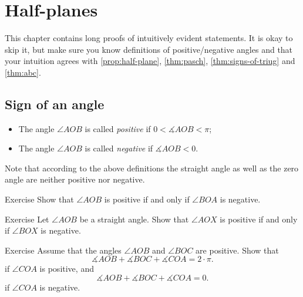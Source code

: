 \chapter{Half-planes}\label{chap:half-planes}

This chapter contains long proofs of intuitively evident statements.
It is okay to skip it, but make sure you know definitions of positive/negative angles and that your intuition agrees with \ref{prop:half-plane}, \ref{thm:pasch}, \ref{thm:signs-of-triug} and \ref{thm:abc}.

 
                            
\section*{Sign of an angle}

\begin{itemize}
\item The angle $\angle A O B$ is called \emph{positive} 
if $0<\measuredangle A O B<\pi$;
\item The  angle $\angle A O B$ is called {}\emph{negative} 
if $\measuredangle A O B<0$.
\end{itemize}

Note that according to the above definitions the straight angle as well as the zero angle 
are neither positive nor negative.

\begin{thm}{Exercise}\label{ex:AOB+<=>BOA-}
Show that $\angle A O B$ is positive if and only if $\angle B O A$ is negative.
\end{thm}

\begin{thm}{Exercise}\label{ex:straight-sign}
Let $\angle AOB$ be a straight angle.
Show that $\angle AOX$ is positive 
if and only if $\angle BOX$ is negative.
\end{thm}

\begin{thm}{Exercise}\label{ex:PP(PN)}
Assume that the angles $\angle AOB$ and $\angle BOC$ are positive. 
Show that
$$\measuredangle AOB+\measuredangle BOC+\measuredangle COA=2\cdot\pi.$$
if $\angle COA$ is positive,
and
$$\measuredangle AOB+\measuredangle BOC+\measuredangle COA=0.$$
if $\angle COA$ is negative.
\end{thm}




